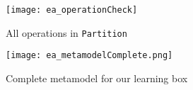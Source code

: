 \begin{enumerate}
\vspace{1cm}

\begin{figure}[h!]
	\centering
  \texttt{[image: ea\_operationCheck]}
	\caption{All operations in \texttt{Partition}}
	\label{fig:operation_partition}
\end{figure}

\newpage

\vspace*{2cm}

\begin{figure}[htbp]
	\centering
  \texttt{[image: ea\_metamodelComplete.png]}
\caption[Complete metamodel for our learning box.]{Complete metamodel for our learning box}
	\label{fig:metamodel_complete}
\end{figure}
\FloatBarrier


\end{enumerate}

